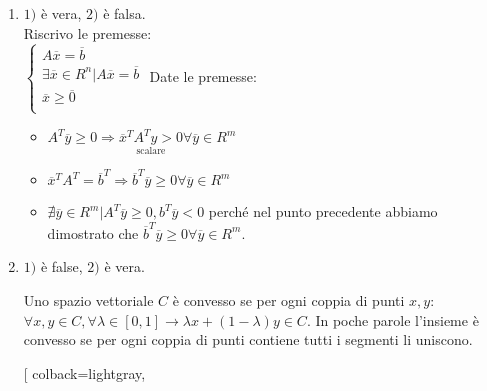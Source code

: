 \documentclass{article}
\begin{document}
\begin{tcolorbox}[
    colback=lightgray,
    colframe=black,
    coltext=black,
    title=Dimostrazione,
    colbacktitle=black,
    coltitle=lightgray,
    breakable
  ]
  \begin{enumerate}
    \item $1)$ è vera, $2)$ è falsa.\\
          Riscrivo le premesse:\\

          $
            \begin{cases}
              A\overline{x}=\overline{b}                             \\
              \exists \overline{x}\in R^n|A\overline{x}=\overline{b} \\
              \overline{x}\ge \overline{0}                           \\
            \end{cases}
          $
          Date le premesse:
          \begin{itemize}
            \item $A^T\overline{y}\ge 0 \Rightarrow \underset{\text{scalare}}{\overline{x}^T A^T y > 0} \forall\overline{y}\in R^m$
            \item $\overline{x}^TA^T=\overline{b}^T \Rightarrow \overline{b}^T\overline{y}\ge 0 \forall \overline{y} \in R^m$
            \item $\nexists\overline{y}\in R^m| A^T\overline{y}\ge 0, b^T\overline{y} < 0$ perché nel punto precedente abbiamo dimostrato che $\overline{b}^T\overline{y}\ge 0 \forall \overline{y} \in R^m$.
          \end{itemize}
    \item $1)$ è false, $2)$ è vera.\\
          \begin{tcolorbox}[
              colback=lightgray,
              colframe=black,
              coltext=black,
              title=Convessità,
              colbacktitle=black,
              coltitle=lightgray,
            ]
            Uno spazio vettoriale $C$ è convesso se per ogni coppia di punti $x,y$:\\
            $\forall x, y \in C, \forall \lambda \in [0,1] \to \lambda x+(1-\lambda)y \in C$. In poche parole l'insieme è convesso se per ogni coppia di punti contiene tutti i segmenti li uniscono.
          \end{tcolorbox}
          \begin{tcolorbox}[
              colback=lightgray,

\end{tcolorbox}
\end{enumerate}
\end{tcolorbox}
\end{document}
